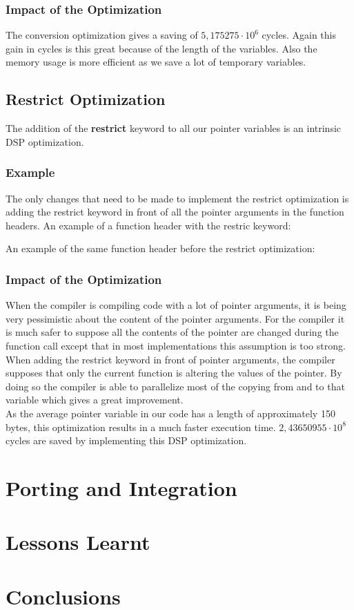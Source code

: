 \documentclass[a4paper]{article}
\begin{document}
\subsubsection{Impact of the Optimization}
The conversion optimization gives a saving of $5,175275\cdot10^{6}$ cycles. Again this gain in cycles is this great because of the length of the variables. Also the memory usage is more efficient as we save a lot of temporary variables.

\subsection{Restrict Optimization}

The addition of the \textbf{restrict} keyword to all our pointer variables is an intrinsic DSP optimization.

\subsubsection{Example}
The only changes that need to be made to implement the restrict optimization is adding the restrict keyword in front of all the pointer arguments in the function headers. An example of a function header with the restric keyword:

%
An example of the same function header before the restrict optimization:

%

\subsubsection{Impact of the Optimization}
When the compiler is compiling code with a lot of pointer arguments, it is being very pessimistic about the content of the pointer arguments. For the compiler it is much safer to suppose all the contents of the pointer are changed during the function call except that in most implementations this assumption is too strong. When adding the restrict keyword in front of pointer arguments, the compiler supposes that only the current function is altering the values of the pointer. By doing so the compiler is able to parallelize most of the copying from and to that variable which gives a great improvement.\\

As the average pointer variable in our code has a length of approximately 150 bytes, this optimization results in a much faster execution time. $2,43650955\cdot10^{8}$ cycles are saved by implementing this DSP optimization.

\section{Porting and Integration}

\section{Lessons Learnt}

\section{Conclusions}
\end{document}
